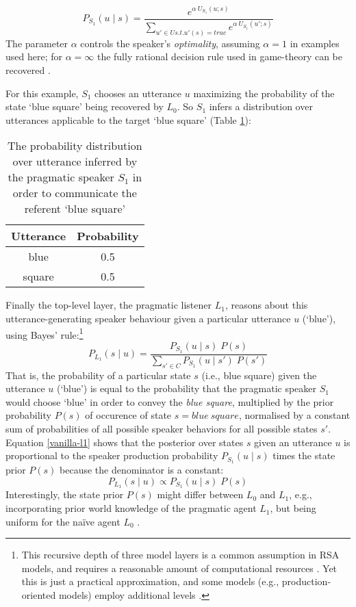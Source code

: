 \begin{equation}
P_{S_1}(u \mid s) = \frac{e^{\alpha \: U_{S_1} (u; s)}}{\sum_{u' \in U s.t. u'(s) = true} e^{\alpha \: U_{S_1} (u'; s)}}
\end{equation}
The parameter $\alpha$ controls the speaker's \emph{optimality}, assuming $\alpha = 1$ in examples used here; for $\alpha = \infty $ the fully rational decision rule used in game-theory can be recovered \parencite{problang, lassiter2017adjectival}.

For this example, $S_1$ chooses an utterance $u$ maximizing the probability of the state `blue square' being recovered by $L_0$. So $S_1$ infers a distribution over utterances applicable to the target `blue square' (Table \ref{rsa-s1}):

\begin{table}[h]
	\begin{center}
		\caption{The probability distribution over utterance inferred by the pragmatic speaker $S_1$ in order to communicate the referent `blue square'}
		\label{rsa-s1}
		\vskip 0.12in
		\begin{tabular}{cc}
			Utterance & Probability \\
			\hline
			blue & 0.5 \\
			square & 0.5
		\end{tabular}
	\end{center}
\end{table}
 
Finally the top-level layer, the pragmatic listener $L_1$, reasons about this utterance-generating speaker behaviour given a particular utterance $u$ (`blue'), using Bayes' rule:\footnote{This recursive depth of three model layers is a common assumption in RSA models, and requires a reasonable amount of computational resources \parencite{lassiter2017adjectival}. Yet this is just a practical approximation, and some models (e.g., production-oriented models) employ additional levels \parencite{problang}.}
\begin{equation}
\label{vanilla-l1} 
P_{L_1}(s \mid u) = \frac{P_{S_1}(u \mid s) \; P(s)}{\sum_{s' \in C} P_{S_1}(u \mid s') \; P(s')}
\end{equation}
That is, the probability of a particular state $s$ (i.e., blue square) given the utterance $u$ (`blue') is equal to the probability that the pragmatic speaker $S_1$ would choose `blue' in order to convey the \textit{blue square}, multiplied by the prior probability $P(s)$ of occurence of state $s = blue \:square$, normalised by a constant sum of probabilities of all possible speaker behaviors for all possible states $s'$. 
Equation \ref{vanilla-l1} shows that the posterior over states $s$ given an utterance $u$ is proportional to the speaker production probability $P_{S_1}(u \mid s)$ times the state prior $P(s)$ because the denominator is a constant: 
\begin{equation}
P_{L_1}(s \mid u) \propto P_{S_1}(u \mid s) \; P(s)
\end{equation} 
Interestingly, the state prior $P(s)$ might differ between $L_0$ and $L_1$, e.g., incorporating prior world knowledge of the pragmatic agent $L_1$, but being uniform for the na\"ive agent $L_0$ \parencite{problang}. 

